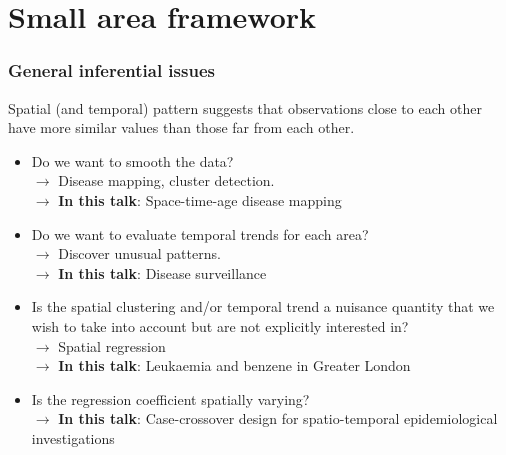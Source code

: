 \documentclass[slidestop,compress,serif,10pt]{beamer}
\begin{document}
\section{Small area framework}
\begin{frame}
\begin{center}
\vfill\fontsize{20}{20}\selectfont{Small area framework}\end{center}
\end{frame}
\begin{frame}\frametitle{General inferential issues}


Spatial (and temporal) pattern suggests that observations close to each other have more similar
	values than those far from each other.
	


	\begin{itemize}
\pause\vfill		\item Do we want to smooth the data?\\ $\rightarrow$ Disease mapping, cluster detection.\\
	$\rightarrow$ {\bf In this talk}: \alert{Space-time-age disease mapping}\\
\pause\vfill		\item Do we want to evaluate temporal trends for each area?\\
	$\rightarrow$ Discover unusual patterns.\\ 
	$\rightarrow$ {\bf In this talk}: \alert{Disease surveillance}\\
	
\pause\vfill	\item Is the spatial clustering and/or temporal trend a nuisance quantity that we wish to take into account but are not explicitly interested in?\\ $\rightarrow$ Spatial regression\\
	$\rightarrow$ {\bf In this talk}: \alert{Leukaemia and benzene in Greater London}\\
\pause	\vfill\item Is the regression coefficient spatially varying?\\
		$\rightarrow$ {\bf In this talk}: \alert{Case-crossover design for spatio-temporal epidemiological investigations}\\
\end{itemize}
\end{frame}
\end{document}
